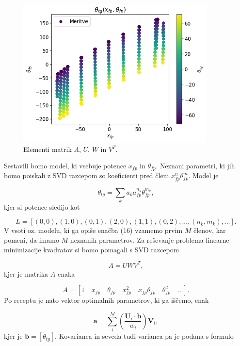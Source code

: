 \documentclass[slovene,11pt,a4paper]{article}
\begin{document}
\begin{figure}[h!]
\centering
\includegraphics[width=10cm]{spektro1.png}
\caption{Elementi matrik $A$, $U$, $W$ in $V^T$.}
\end{figure}

Sestavili bomo model, ki vsebuje potence $x_{fp}$ in $\theta_{fp}$. Neznani parametri, ki jih bomo poiskali z SVD razcepom so koeficienti pred členi $x_{fp}^n \theta_{fp}^m$. Model je

\begin{equation}
\theta_{tg} = \sum_k a_k a_{fp}^{n_k} \theta_{fp}^{m_k},
\end{equation}
kjer si potence sledijo kot

\begin{equation}
L = [(0,0), (1,0), (0,1), (2,0), (1,1), (0,2), ..., (n_k, m_k), ...].
\end{equation}
V vsoti oz. modelu, ki ga opiše enačba (16) vzamemo prvim $M$ členov, kar pomeni, da imamo $M$ neznanih parametrov. Za reševanje problema linearne minimizacije kvadratov si bomo pomagali s SVD razcepom

\begin{equation}
A = UWV^T,
\end{equation}
kjer je matrika $A$ enaka

\begin{equation}
A = [1 \quad x_{fp} \quad \theta_{fp} \quad x_{fp}^2 \quad x_{fp}\theta_{fp} \quad \theta_{fp}^2 \quad ... ].
\end{equation}
Po receptu je nato vektor optimalnih parametrov, ki ga iščemo, enak

\begin{equation}
\textbf{a} = \sum_i^M \left( \frac{\textbf{U}_i \cdot \textbf{b}}{w_i} \right) \textbf{V}_i,
\end{equation}
kjer je $\textbf{b} = [\theta_{tg}]$. Kovarianca in seveda tudi varianca pa je podana s formulo
\end{document}
